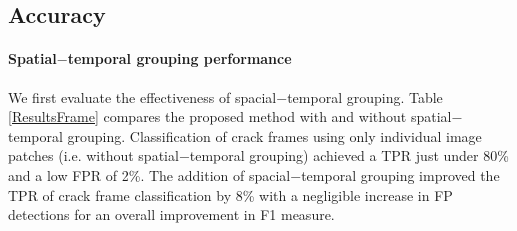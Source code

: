         

    \subsection{Accuracy}

        \paragraph{Spatial$-$temporal grouping performance}
            We first evaluate the effectiveness of spacial$-$temporal grouping. Table \ref{ResultsFrame} compares the proposed method with and without spatial$-$temporal grouping. 
            Classification of crack frames using only individual image patches (i.e. without spatial$-$temporal grouping) achieved a TPR just under 80\% and a low FPR of 2\%. The addition of spacial$-$temporal grouping improved the TPR of crack frame classification by 8\% with a negligible increase in FP detections for an overall improvement in F1 measure.   
            

